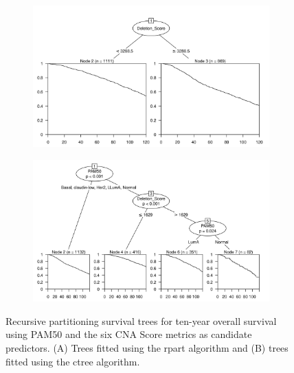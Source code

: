 \begin{figure}[!htb]
\centering

\vspace{0.5cm}

\begin{subfigure}{\textwidth}
\subcaption{}
\includegraphics[width=1\textwidth]{../figures/Appendices/Appendix_B/PartyKit_Survival_Score_TenYearOS_PAM50.png}
\end{subfigure}

\vspace{2cm}

\begin{subfigure}{\textwidth}
\subcaption{}
\includegraphics[width=1\textwidth]{../figures/Appendices/Appendix_B/Ctree_Survival_Score_TenYearOS_PAM50.png}
\end{subfigure}

\vspace{0.5cm}

\caption[Recursive partitioning survival trees for ten-year overall survival using PAM50 and the six CNA Score metrics as candidate predictors.]{Recursive partitioning survival trees for ten-year overall survival using PAM50 and the six CNA Score metrics as candidate predictors. (A) Trees fitted using the rpart algorithm and (B) trees fitted using the ctree algorithm.}
\end{figure}

